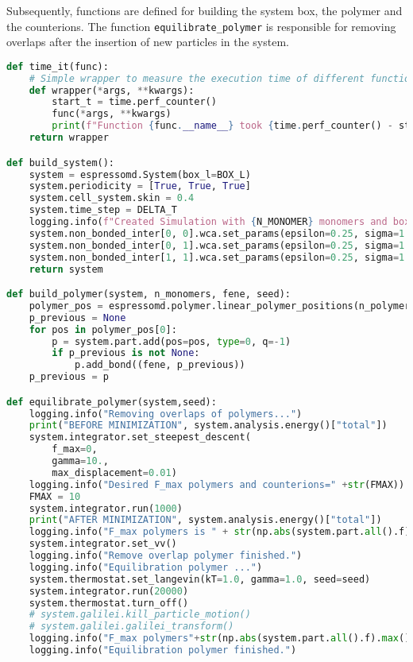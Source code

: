 Subsequently, functions are defined for building the system box, the polymer and the counterions. The function \texttt{equilibrate\_polymer} is responsible for removing overlaps after the insertion of new particles in the system.
\begin{lstlisting}[language=python]
def time_it(func):
	# Simple wrapper to measure the execution time of different functions.
	def wrapper(*args, **kwargs):
		start_t = time.perf_counter()
		func(*args, **kwargs)
		print(f"Function {func.__name__} took {time.perf_counter() - start_t:.2f}s to execute.")
	return wrapper

def build_system():
	system = espressomd.System(box_l=BOX_L)
	system.periodicity = [True, True, True]
	system.cell_system.skin = 0.4
	system.time_step = DELTA_T
	logging.info(f"Created Simulation with {N_MONOMER} monomers and box length L={BOX_L}.")
	system.non_bonded_inter[0, 0].wca.set_params(epsilon=0.25, sigma=1.0)
	system.non_bonded_inter[0, 1].wca.set_params(epsilon=0.25, sigma=1.0)
	system.non_bonded_inter[1, 1].wca.set_params(epsilon=0.25, sigma=1.0)
	return system

def build_polymer(system, n_monomers, fene, seed):
	polymer_pos = espressomd.polymer.linear_polymer_positions(n_polymers=1, beads_per_chain=n_monomers, seed=seed, bond_length=0.91, min_distance=0.9, start_positions=np.expand_dims(BOX_L/2., 0))
	p_previous = None
	for pos in polymer_pos[0]:
		p = system.part.add(pos=pos, type=0, q=-1)
		if p_previous is not None:
			p.add_bond((fene, p_previous))
	p_previous = p

def equilibrate_polymer(system,seed):
	logging.info("Removing overlaps of polymers...")
	print("BEFORE MINIMIZATION", system.analysis.energy()["total"])
	system.integrator.set_steepest_descent(
		f_max=0,
		gamma=10.,
		max_displacement=0.01)
	logging.info("Desired F_max polymers and counterions=" +str(FMAX))
	FMAX = 10
	system.integrator.run(1000)
	print("AFTER MINIMIZATION", system.analysis.energy()["total"])
	logging.info("F_max polymers is " + str(np.abs(system.part.all().f).max()))
	system.integrator.set_vv()
	logging.info("Remove overlap polymer finished.")
	logging.info("Equilibration polymer ...")
	system.thermostat.set_langevin(kT=1.0, gamma=1.0, seed=seed)
	system.integrator.run(20000)
	system.thermostat.turn_off()
	# system.galilei.kill_particle_motion()
	# system.galilei.galilei_transform()
	logging.info("F_max polymers"+str(np.abs(system.part.all().f).max()))
	logging.info("Equilibration polymer finished.")


\end{lstlisting}
